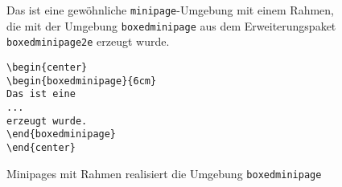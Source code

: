 \begin{figure}[H]
\begin{minipage}[c]{.5\textwidth}
\setlength{\parskip}{1em}
\begin{center}
\begin{boxedminipage}{6cm}
Das ist eine gewöhnliche \verb!minipage!-Umgebung mit 
einem Rahmen, die mit der Umgebung \verb!boxedminipage! aus dem Erweiterungspaket \verb!boxedminipage2e! erzeugt wurde.
\end{boxedminipage}
\end{center}
\end{minipage}
\hfill
\begin{minipage}{.48\textwidth}
\setlength{\parskip}{1em}
\begin{lstlisting}[label=boxedminipagebeispiel, style=customlatex]
\begin{center}
\begin{boxedminipage}{6cm}
Das ist eine 
...
erzeugt wurde.
\end{boxedminipage}
\end{center}
\end{lstlisting}
\end{minipage}
\caption{Minipages mit Rahmen realisiert die Umgebung \texttt{boxedminipage}}
\label{Beispiel_boxedminipage}
\end{figure}

